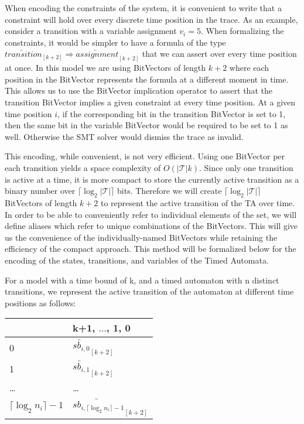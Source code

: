 \documentclass[a4paper,12pt]{article}
\begin{document}
When encoding the constraints of the system, it is convenient to write that a
constraint will hold over every discrete time position in the trace. As an
example, consider a transition with a variable assignment \(v_i = 5\). When
formalizing the constraints, it would be simpler to have a formula of the type
\(\overleftarrow{transition}_{[k+2]} \Rightarrow
\overleftarrow{assignment}_{[k+2]}\) that we can assert over every time position
at once. In this model we are using BitVectors of length \(k+2\) where each
position in the BitVector represents the formula at a different moment in time.
This allows us to use the BitVector implication operator to assert that the
transition BitVector implies a given constraint at every time position. At a
given time position \(i\), if the corresponding bit in the transition BitVector
is set to 1, then the same bit in the variable BitVector would be required to be
set to 1 as well. Otherwise the SMT solver would dismiss the trace as invalid.

This encoding, while convenient, is not very efficient. Using one BitVector per
each transition yields a space complexity of \(O(|\mathcal{T}|k)\). Since only
one transition is active at a time, it is more compact to store the currently
active transition as a binary number over \(\lceil\log_2 |\mathcal{T}|\rceil\)
bits. Therefore we will create \(\lceil\log_2 |\mathcal{T}|\rceil\) BitVectors of length
\(k+2\) to represent the active transition of the TA over time. In order to be
able to conveniently refer to individual elements of the set, we will define
aliases which refer to unique combinations of the BitVectors. This will give us
the convenience of the individually-named BitVectors while retaining the
efficiency of the compact approach. This method will be formalized below for the
encoding of the states, transitions, and variables of the Timed Automata.

For a model with a time bound of k, and a timed automaton with n distinct
transitions, we represent the active transition of the automaton at different
time positions as follows:

\begin{table}
\centering
\begin{tabular}{ll}
 & k+1, \(\ldots\), 1, 0\\
\midrule
0 & \(\overleftarrow{sb_{i,0}}_{[k+2]}\)\\
1 & \(\overleftarrow{sb_{i,1}}_{[k+2]}\)\\
\ldots{} & \ldots{}\\
\(\lceil \log_2 n_i \rceil -1\) & \(\overleftarrow{sb_{i, \lceil \log_2 n_i \rceil -1}}_{[k+2]}\)\\
\end{tabular}
\end{table}
\end{document}
